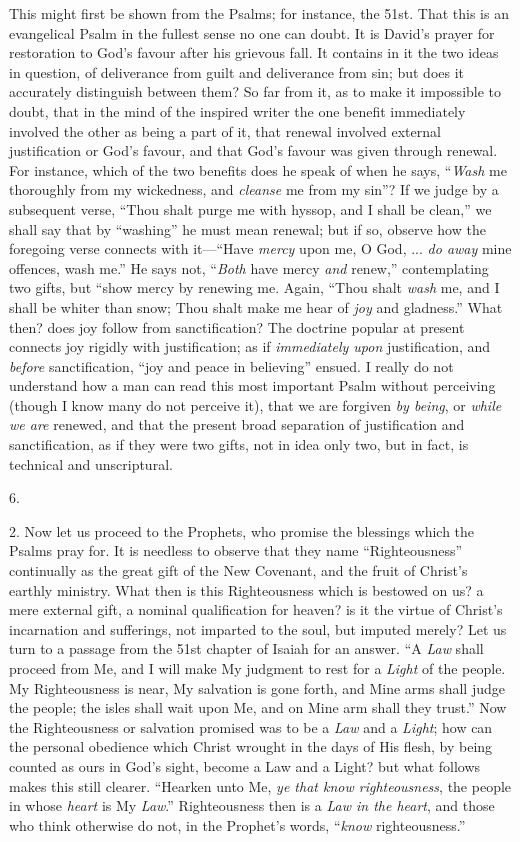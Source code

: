 This might first be shown from the Psalms; for instance, the 51st.
That this is an evangelical Psalm in the fullest sense no one can
doubt. It is David's prayer for restoration to God's favour after his
grievous fall. It contains in it the two ideas in question, of
deliverance from guilt and deliverance from sin; but does it
accurately distinguish between them? So far from it, as to make it
impossible to doubt, that in the mind of the inspired writer the one
benefit immediately involved the other as being a part of it, that
renewal involved external justification or God's favour, and that
God's favour was given through renewal. For instance, which of the two
benefits does he speak of when he says, ``\emph{Wash} me
thoroughly from my wickedness, and \emph{cleanse} me from my
sin''? If we judge by a subsequent verse, ``Thou shalt purge
me with hyssop, and I shall be clean,'' we shall say that by
``washing'' he must mean renewal; but if so, observe how the
foregoing verse connects with it—``Have \emph{mercy} upon me, O God,
... \emph{do away} mine offences, wash me.'' He says not, ``\emph{Both}
have mercy \emph{and} renew,'' contemplating two gifts, but
``show mercy by renewing me. Again, ``Thou shalt \emph{wash}
me, and I shall be whiter than snow; Thou shalt make me hear of \emph{joy}
and gladness.'' What then? does joy follow from sanctification?
The doctrine popular at present connects joy rigidly with
justification; as if \emph{immediately upon} justification, and \emph{before}
sanctification, ``joy and peace in believing'' ensued. I
really do not understand how a man can read this most important Psalm
without perceiving (though I know many do not perceive it), that we
are forgiven \emph{by being}, or \emph{while we are} renewed, and that
the present broad separation of justification and sanctification, as
if they were two gifts, not in idea only two, but in fact, is
technical and unscriptural.

6.

2. Now let us proceed to the Prophets, who promise the blessings
which the Psalms pray for. It is needless to observe that they name
``Righteousness'' continually as the great gift of the New
Covenant, and the fruit of Christ's earthly ministry. What then is
this Righteousness which is bestowed on us? a mere external gift, a
nominal qualification for heaven? is it the virtue of Christ's
incarnation and sufferings, not imparted to the soul, but imputed
merely? Let us turn to a passage from the 51st chapter of Isaiah for
an answer. ``A \emph{Law} shall proceed from Me, and I will make
My judgment to rest for a \emph{Light} of the people. My Righteousness
is near, My salvation is gone forth, and Mine arms shall judge the
people; the isles shall wait upon Me, and on Mine arm shall they
trust.'' Now the Righteousness or salvation promised was to
be a \emph{Law} and a \emph{Light}; how can the personal obedience
which Christ wrought in the days of His flesh, by being counted as
ours in God's sight, become a Law and a Light? but what follows makes
this still clearer. ``Hearken unto Me, \emph{ye that know
righteousness}, the people in whose \emph{heart} is My \emph{Law}.''
Righteousness then is a \emph{Law in the heart}, and those who think
otherwise do not, in the Prophet's words, ``\emph{know}
righteousness.''

